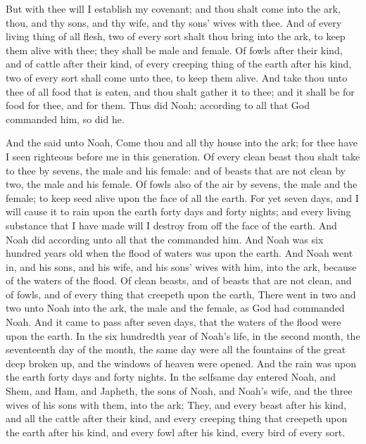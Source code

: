 \begin{biblechapter}
\verse But with thee will I establish my covenant; and thou shalt come into the ark, thou, and thy sons, and thy wife, and thy sons' wives with thee.
\verse And of every living thing of all flesh, two of every sort shalt thou bring into the ark, to keep them alive with thee; they shall be male and female.
\verse Of fowls after their kind, and of cattle after their kind, of every creeping thing of the earth after his kind, two of every sort shall come unto thee, to keep them alive.
\verse And take thou unto thee of all food that is eaten, and thou shalt gather it to thee; and it shall be for food for thee, and for them.
\verse Thus did Noah; according to all that God commanded him, so did he.
\end{biblechapter}

\begin{biblechapter} %
\verse And the \LORD said unto Noah, Come thou and all thy house into the ark; for thee have I seen righteous before me in this generation.
\verse Of every clean beast thou shalt take to thee by sevens, the male and his female: and of beasts that are not clean by two, the male and his female.
\verse Of fowls also of the air by sevens, the male and the female; to keep seed alive upon the face of all the earth.
\verse For yet seven days, and I will cause it to rain upon the earth forty days and forty nights; and every living substance that I have made will I destroy from off the face of the earth.
\verse And Noah did according unto all that the \LORD commanded him.
\verse And Noah was six hundred years old when the flood of waters was upon the earth.
\verse And Noah went in, and his sons, and his wife, and his sons' wives with him, into the ark, because of the waters of the flood.
\verse Of clean beasts, and of beasts that are not clean, and of fowls, and of every thing that creepeth upon the earth,
\verse There went in two and two unto Noah into the ark, the male and the female, as God had commanded Noah.
\verse And it came to pass after seven days, that the waters of the flood were upon the earth.
\verse In the six hundredth year of Noah's life, in the second month, the seventeenth day of the month, the same day were all the fountains of the great deep broken up, and the windows of heaven were opened.
\verse And the rain was upon the earth forty days and forty nights.
\verse In the selfsame day entered Noah, and Shem, and Ham, and Japheth, the sons of Noah, and Noah's wife, and the three wives of his sons with them, into the ark;
\verse They, and every beast after his kind, and all the cattle after their kind, and every creeping thing that creepeth upon the earth after his kind, and every fowl after his kind, every bird of every sort.

\end{biblechapter}

